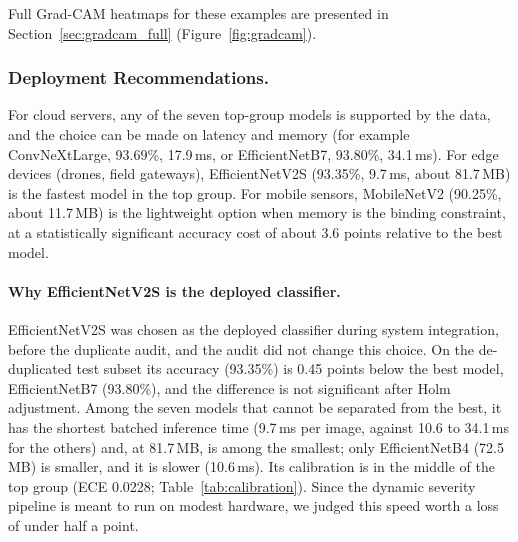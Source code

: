 Full Grad-CAM heatmaps for these examples are presented in
Section~\ref{sec:gradcam_full} (Figure~\ref{fig:gradcam}).

\subsubsection*{Deployment Recommendations.}
For cloud servers, any of the seven top-group models is supported by the data, and the choice can be made on latency and memory (for example ConvNeXtLarge, 93.69\%, 17.9\,ms, or EfficientNetB7, 93.80\%, 34.1\,ms). For edge devices (drones, field gateways), EfficientNetV2S (93.35\%, 9.7\,ms, about 81.7\,MB) is the fastest model in the top group. For mobile sensors, MobileNetV2 (90.25\%, about 11.7\,MB) is the lightweight option when memory is the binding constraint, at a statistically significant accuracy cost of about 3.6 points relative to the best model.

\paragraph{Why EfficientNetV2S is the deployed classifier.} EfficientNetV2S was chosen as the deployed classifier during system integration, before the duplicate audit, and the audit did not change this choice. On the de-duplicated test subset its accuracy (93.35\%) is 0.45 points below the best model, EfficientNetB7 (93.80\%), and the difference is not significant after Holm adjustment. Among the seven models that cannot be separated from the best, it has the shortest batched inference time (9.7\,ms per image, against 10.6 to 34.1\,ms for the others) and, at 81.7\,MB, is among the smallest; only EfficientNetB4 (72.5\,MB) is smaller, and it is slower (10.6\,ms). Its calibration is in the middle of the top group (ECE 0.0228; Table~\ref{tab:calibration}). Since the dynamic severity pipeline is meant to run on modest hardware, we judged this speed worth a loss of under half a point.
